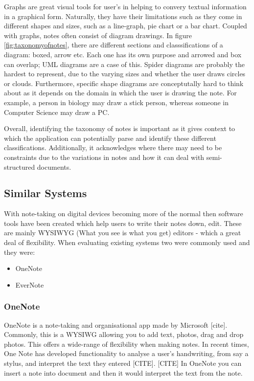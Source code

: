 Graphs are great visual tools for user's in helping to convery textual information in a graphical form. Naturally, they have their limitations such as they come in different shapes and sizes, such as a line-graph, pie chart or a bar chart. Coupled with graphs, notes often consist of diagram drawings.  In figure \ref{fig:taxonomyofnotes}, there are different sections and classsifications of a diagram: boxed, arrow etc. Each one has its own purpose and arrowed and box can overlap; UML diagrams are a case of this. Spider diagrams are probably the hardest to represent, due to the varying sizes and whether the user draws circles or clouds. Furthermore, specific shape diagrams are conceptutally hard to think about as it depends on the domain in which the user is drawing the note. For example, a person in biology may draw a stick person, whereas someone in Computer Science may draw a PC. 

Overall, identifying the taxonomy of notes is important as it gives context to which the application can potentially parse and identify these different classifications. Additionally, it acknowledges where there may need to be constraints due to the variations in notes and how it can deal with semi-structured documents.




\subsection{Similar Systems}
With note-taking on digital devices becoming more of the normal then software tools have been created which help users to write their notes down, edit. These are mainly WYSIWYG (What you see is what you get) editors - which a great deal of flexibility. When evaluating existing systems two were commonly used and they were: 
\begin{itemize}
  \item OneNote
  \item EverNote
\end{itemize}
\subsubsection{OneNote}
OneNote is a note-taking and organisational app made by Microsoft [cite]. Commonly, this is a WYSIWG allowing you to add text, photos, drag and drop photos. This offers a wide-range of flexibility when making notes. In recent times, One Note has developed functionality to analyse a user's handwriting, from say a stylus, and interpret the text they entered [CITE]. [CITE] In OneNote you can insert a note into document and then it would interpret the text from the note.
